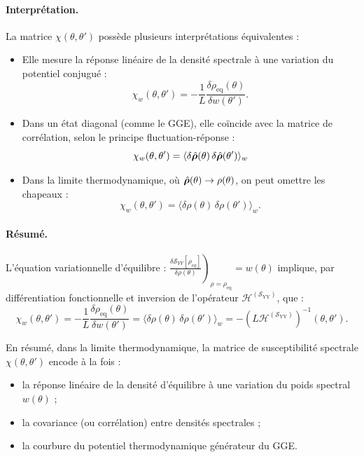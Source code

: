 \paragraph{Interprétation.}
La matrice $\chi(\theta, \theta')$ possède plusieurs interprétations équivalentes :
\begin{itemize}[label = $\bullet$]
  \item Elle mesure la réponse linéaire de la densité spectrale à une variation du potentiel conjugué :
  \[
  \chi_w(\theta, \theta') = - \frac{1}{L}\frac{\delta \rho_{\mathrm{eq}}(\theta)}{\delta w(\theta')}.
  \]
  \item Dans un état diagonal (comme le GGE), elle coïncide avec la matrice de corrélation, selon le principe fluctuation-réponse :
  \[
  \chi_w(\theta, \theta') = \langle \delta \operator{\rho}(\theta)\, \delta \operator{\rho}(\theta') \rangle_w%
  \]
  \item Dans la limite thermodynamique, où $\hat{\bm{\rho}}(\theta) \to \rho(\theta)$, on peut omettre les chapeaux :
  \[
  \chi_w(\theta, \theta') = \langle \delta \rho(\theta)\, \delta \rho(\theta') \rangle_w.
  \]
\end{itemize}

\paragraph{Résumé.}
L'équation variationnelle d'équilibre :
\(
\left.\frac{\delta \mathcal{S}_{YY}[\rho_{eq}]}{\delta \rho(\theta)} \right)_{\rho = \rho_{\mathrm{eq}}} = w(\theta)
\)
implique, par différentiation fonctionnelle et inversion de l’opérateur $\mathcal{H}^{(\mathcal{S}_{\mathrm{YY}})}$, que :
\[
\chi_w(\theta, \theta') =   - \frac{1}{L}\frac{\delta \rho_{\mathrm{eq}}(\theta)}{\delta w(\theta')} = \langle \delta \rho(\theta)\, \delta \rho(\theta') \rangle_w  = - \left( L \mathcal{H}^{(\mathcal{S}_{\mathrm{YY}})} \right)^{-1} (\theta, \theta') .
\]

\noindent
En résumé, dans la limite thermodynamique, la matrice de susceptibilité spectrale $\chi(\theta, \theta')$ encode à la fois :

\begin{itemize}[label = $\bullet$] 
  \item la réponse linéaire de la densité d'équilibre à une variation du poids spectral $w(\theta)$ ;
  \item la covariance (ou corrélation) entre densités spectrales ;
  \item la courbure du potentiel thermodynamique générateur du GGE.
\end{itemize}

